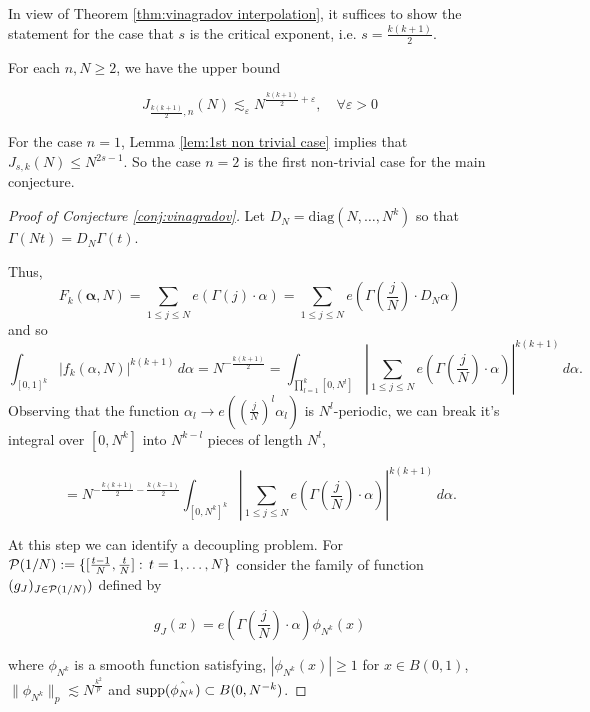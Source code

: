 In view of Theorem \ref{thm:vinagradov interpolation}, it suffices to show the statement for the case that $s$ is the critical exponent, i.e. $s=\frac{k(k+1)}{2}$.

\begin{conj}\label{conj:vinagradov}
    For each $n, N \geq 2$, we have the upper bound

$$
J_{\frac{k(k+1)}{2}, n}(N) \lesssim_{\varepsilon }N^{\frac{k(k+1)}{2}+\varepsilon}, \quad \forall \varepsilon>0
$$
\end{conj}


For the case $n=1$, Lemma \ref{lem:1st non trivial case} implies that $J_{s, k}(N) \leq N^{2 s-1}$. So the case $n=2$ is the first non-trivial case for the main conjecture.


\begin{proof}[Proof of Conjecture \ref{conj:vinagradov}]
    Let $D_N=\text{diag}(N,\dots,N^{k})$ so that $\Gamma(Nt)= D_{N}\Gamma(t)$.

    Thus,
\begin{equation}
    F_{k}(\boldsymbol{\alpha},N) = \sum_{1\leq j\leq N} e(\Gamma(j)\cdot\alpha) = \sum_{1\leq j\leq N} e\left(\Gamma(\frac{j}{N})\cdot D_{N}\alpha\right)
\end{equation}
and so 
\begin{equation}
    \int_{[0,1]^k} |f_{k}(\alpha,N)|^{k(k+1)}\,d\alpha = N^{-\frac{k(k+1)}{2}} = \int_{\prod_{l=1}^{k}[0,N^{l}] } \left|\sum_{1\leq j\leq N} e\left(\Gamma(\frac{j}{N})\cdot \alpha\right) \right|^{k(k+1)}\,d\alpha.
\end{equation}
Observing that the function $\alpha_{l}\xrightarrow[]{}e((\frac{j}{N})^{l}\alpha_{l})$ is $N^{l}$-periodic, we can break it's integral over $[0,N^{k}]$ into $N^{k-l}$ pieces of length $N^{l}$,

\begin{equation}\label{eq:proof conj}
    =  N^{-\frac{k(k+1)}{2}-\frac{k(k-1)}{2}} \int_{[0,N^{k}]^k} \left|\sum_{1\leq j\leq N}e\left(\Gamma(\frac{j}{N})\cdot \alpha\right) \right|^{k(k+1)}\,d\alpha.
\end{equation}

At this step we can identify a decoupling problem. For $\mathcal{P}(1/N):=\{ [\frac{t-1}{N},\frac{t}{N}]:\, t=1,\dots,N\}$ consider the family of function $(g_{J})_{J\in\mathcal{P}(1/N)})$ defined by

$$
g_{J}(x) = e\left(\Gamma(\frac{j}{N})\cdot \alpha\right) \phi_{N^{k}}(x)
$$

where $\phi_{N^{k}}$ is a smooth function satisfying, $|\phi_{N^{k}}(x)|\geq 1$ for $x\in B(0,1)$, $\|\phi_{N^{k}}\|_{p} \lesssim N^{\frac{k^2}{p}}$ and $\text{supp}(\hat{\phi_{N^{k}}}) \subset B(0,N^{-k})$.


\end{proof}
